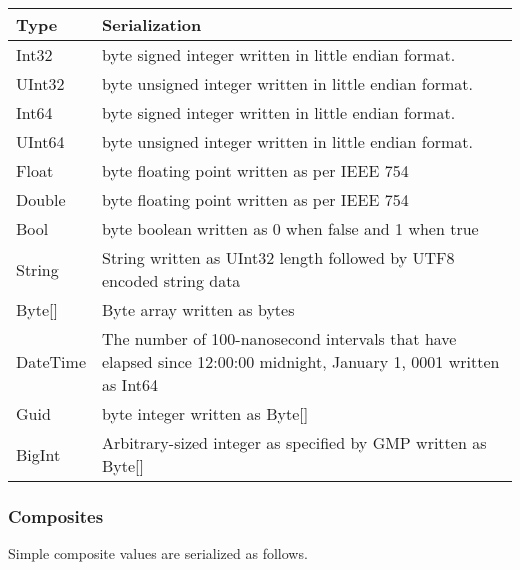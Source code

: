 \documentclass[a4paper]{article}
\begin{document}
\begin{center}
\tablehead{}
\begin{supertabular}{|m{2.582cm}|m{14.026cm}|}
\hline
\sffamily\bfseries Type &
\sffamily\bfseries Serialization\\\hline
\sffamily Int32 &
 byte signed integer written in little endian format.\\\hline
\sffamily UInt32 &
 byte unsigned integer written in little endian
format.\\\hline
\sffamily Int64 &
 byte signed integer written in little endian format.\\\hline
\sffamily UInt64 &
 byte unsigned integer written in little endian
format.\\\hline
\sffamily Float &
 byte floating point written as per IEEE 754\\\hline
\sffamily Double &
 byte floating point written as per IEEE 754\\\hline
\sffamily Bool &
 byte boolean written as 0 when false and 1 when true\\\hline
\sffamily String &
\sffamily String written as UInt32 length followed by UTF8 encoded
string data\\\hline
\sffamily Byte[] &
\sffamily Byte array written as bytes\\\hline
\sffamily DateTime &
\sffamily The number of 100-nanosecond intervals that have elapsed since
12:00:00 midnight, January 1, 0001 written as Int64\\\hline
\sffamily Guid &
 byte integer written as Byte[]\\\hline
\sffamily BigInt &
\sffamily Arbitrary-sized integer as specified by GMP written as
Byte[]\\\hline
\end{supertabular}
\end{center}

\bigskip

\subsubsection{Composites}
{\sffamily
Simple composite values are serialized as follows.}
\end{document}
